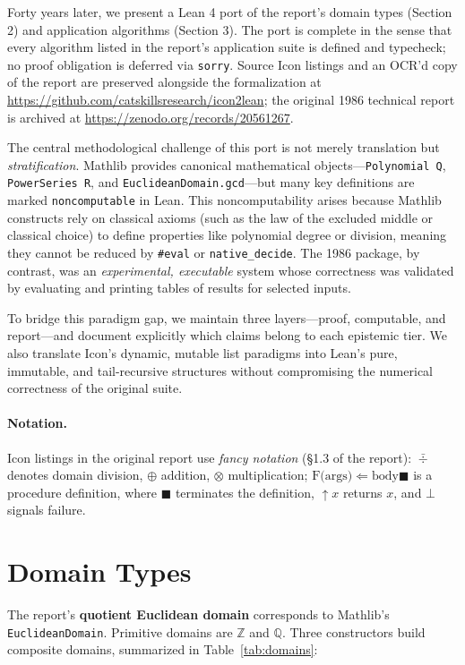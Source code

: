 \documentclass[11pt,a4paper]{article}
\begin{document}
Forty years later, we present a Lean 4 port of the report's domain types (Section 2) and application algorithms (Section 3). The port is complete in the sense that every algorithm listed in the report's application suite is defined and typecheck; no proof obligation is deferred via \texttt{sorry}. Source Icon listings and an OCR'd copy of the report are preserved alongside the formalization at \url{https://github.com/catskillsresearch/icon2lean}; the original 1986 technical report is archived at \url{https://zenodo.org/records/20561267}.

The central methodological challenge of this port is not merely translation but \emph{stratification}. Mathlib provides canonical mathematical objects---\lstinline[style=leanbox]{Polynomial Q}, \lstinline[style=leanbox]{PowerSeries R}, and \lstinline[style=leanbox]{EuclideanDomain.gcd}---but many key definitions are marked \lstinline[style=leanbox]{noncomputable} in Lean. This noncomputability arises because Mathlib constructs rely on classical axioms (such as the law of the excluded middle or classical choice) to define properties like polynomial degree or division, meaning they cannot be reduced by \texttt{\#eval} or \texttt{native\_decide}. The 1986 package, by contrast, was an \emph{experimental, executable} system whose correctness was validated by evaluating and printing tables of results for selected inputs. 

To bridge this paradigm gap, we maintain three layers---proof, computable, and report---and document explicitly which claims belong to each epistemic tier. We also translate Icon's dynamic, mutable list paradigms into Lean’s pure, immutable, and tail-recursive structures without compromising the numerical correctness of the original suite.

\paragraph{Notation.} Icon listings in the original report use \emph{fancy notation} (\S1.3 of the report): $\mathbin{\bar{\div}}$ denotes domain division, $\oplus$ addition, $\otimes$ multiplication; $\text{F(args)} \Leftarrow \text{body} \blacksquare$ is a procedure definition, where $\blacksquare$ terminates the definition, $\uparrow x$ returns $x$, and $\bot$ signals failure.

\section{Domain Types}
The report's \textbf{quotient Euclidean domain} corresponds to Mathlib's \texttt{EuclideanDomain}. Primitive domains are $\mathbb{Z}$ and $\mathbb{Q}$. Three constructors build composite domains, summarized in Table~\ref{tab:domains}:
\end{document}
